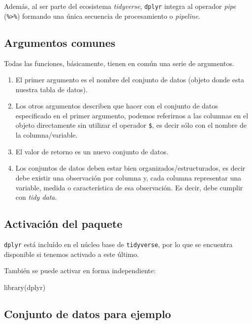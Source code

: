 \documentclass[
  spanish,
  a4paper,
]{scrbook}
\newenvironment{Shaded}{\begin{snugshade}}{\end{snugshade}}
\newcommand{\FunctionTok}[1]{\textcolor[rgb]{0.28,0.35,0.67}{#1}}
\newcommand{\NormalTok}[1]{\textcolor[rgb]{0.00,0.23,0.31}{#1}}
\begin{document}
Además, al ser parte del ecosistema \emph{tidyverse}, \texttt{dplyr}
integra al operador \emph{pipe} (\texttt{\%\textgreater{}\%}) formando
una única secuencia de procesamiento o \emph{pipeline}.

\subsection{Argumentos comunes}\label{argumentos-comunes}

Todas las funciones, básicamente, tienen en común una serie de
argumentos.

\begin{enumerate}
\def\labelenumi{\arabic{enumi}.}
\item
  El primer argumento es el nombre del conjunto de datos (objeto donde
  esta nuestra tabla de datos).
\item
  Los otros argumentos describen que hacer con el conjunto de datos
  especificado en el primer argumento, podemos referirnos a las columnas
  en el objeto directamente sin utilizar el operador \texttt{\$}, es
  decir sólo con el nombre de la columna/variable.
\item
  El valor de retorno es un nuevo conjunto de datos.
\item
  Los conjuntos de datos deben estar bien organizados/estructurados, es
  decir debe existir una observación por columna y, cada columna
  representar una variable, medida o característica de esa observación.
  Es decir, debe cumplir con \emph{tidy data}.
\end{enumerate}

\subsection{Activación del paquete}\label{activaciuxf3n-del-paquete}

\texttt{dplyr} está incluído en el núcleo base de \texttt{tidyverse},
por lo que se encuentra disponible si tenemos activado a este último.

También se puede activar en forma independiente:

\begin{Shaded}
\begin{Highlighting}[]
\FunctionTok{library}\NormalTok{(dplyr)}
\end{Highlighting}
\end{Shaded}

\subsection{Conjunto de datos para
ejemplo}\label{conjunto-de-datos-para-ejemplo}
\end{document}
